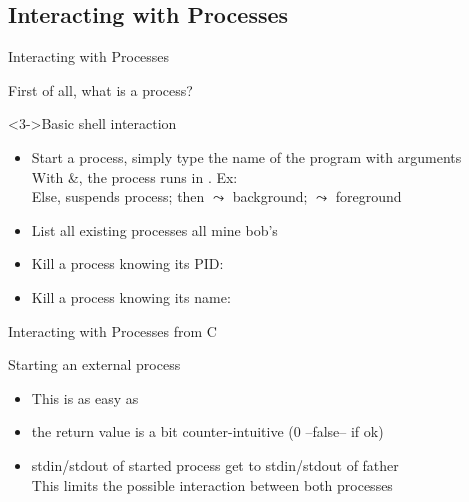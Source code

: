 \begin{Coupe}
\subsection{Interacting with Processes}\subtoc
\begin{frame}{Interacting with Processes}
  \begin{block}{First of all, what is a process?}
  \end{block}

  \begin{block}<3->{Basic shell interaction}
    \begin{itemize}
    \item Start a process, simply type the name of the program with
      arguments\\
      With \&, the process runs in . Ex:
      \\
      Else,  suspends process; then  $\leadsto$
      \alert{b}ack\alert{g}round;  $\leadsto$
      \alert{f}ore\alert{g}round
    \item List all existing processes  
      all mine 
      bob's 
    \item Kill a process knowing its PID: 
    \item Kill a process knowing its name: 
    \end{itemize}
  \end{block}
\end{frame}
\begin{frame}{Interacting with Processes from C}
  \begin{block}{Starting an external process}
    \begin{itemize}
    \item This is as easy as 
    \item {} the return value is a bit counter-intuitive (0 --false-- if ok)
    \item {} stdin/stdout of started process get to
      stdin/stdout of father\\
      This limits the possible interaction between both processes
    \end{itemize}
  \end{block}


\end{frame}
\end{Coupe}
